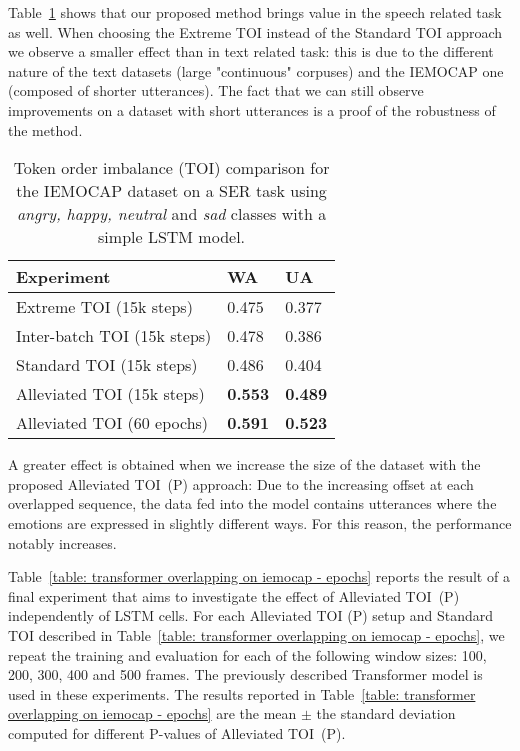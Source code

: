 \documentclass[11pt,a4paper]{article}
\begin{document}
Table~\ref{table: lstm on iemocap} shows that our proposed method brings value in the speech related task as well. When choosing the Extreme TOI instead of the Standard TOI approach we observe a smaller effect than in text related task: this is due to the different nature of the text datasets (large "continuous" corpuses) and the IEMOCAP one (composed of shorter utterances). The fact that we can still observe improvements on a dataset with short utterances is a proof of the robustness of the method.

\begin{table}[t]
\centering

\begin{tabular}{@{}lll@{}}
\toprule
  Experiment & WA & UA \\
  \midrule
  Extreme TOI (15k steps) & 0.475 & 0.377 \\
  Inter-batch TOI (15k steps) & 0.478 & 0.386 \\
  Standard TOI (15k steps) & 0.486 & 0.404 \\
  Alleviated TOI (15k steps) & \textbf{0.553} & \textbf{0.489} \\
  Alleviated TOI (60 epochs) & \textbf{0.591} & \textbf{0.523} \\
\bottomrule
\end{tabular}
\caption{
    \label{table: lstm on iemocap}
    Token order imbalance (TOI) comparison for the IEMOCAP dataset on a SER task using \textit{angry, happy, neutral} and \textit{sad} classes with a simple LSTM model. }
\end{table}

A greater effect is obtained when we increase the size of the dataset with the proposed Alleviated TOI~(P) approach: Due to the increasing offset at each overlapped sequence, the data fed into the model contains utterances where the emotions are expressed in slightly different ways. For this reason, the performance notably increases.

Table~\ref{table: transformer overlapping on iemocap - epochs} reports the result of a final experiment that aims to investigate the effect of Alleviated TOI~(P) independently of LSTM cells. For each Alleviated TOI (P) setup and Standard TOI described in Table~\ref{table: transformer overlapping on iemocap - epochs}, we repeat the training and evaluation for each of the following window sizes: 100, 200, 300, 400 and 500 frames. The previously described Transformer model is used in these experiments.
The results reported in Table~\ref{table: transformer overlapping on iemocap - epochs} are the mean $\pm$ the standard deviation computed for different P-values of Alleviated TOI~(P).
\end{document}
